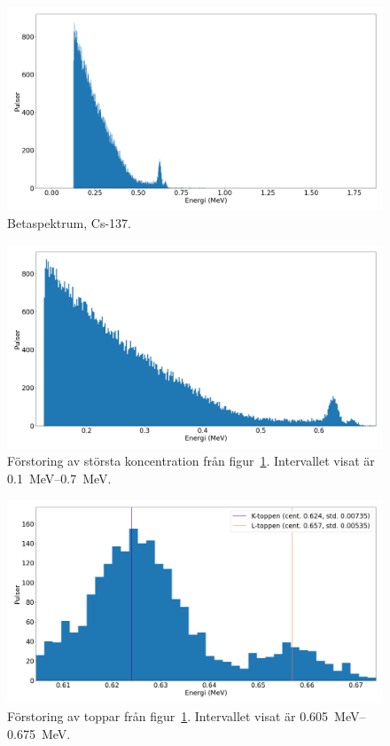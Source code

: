 \begin{figure}[!ht]
    \centering
    \includegraphics[width=\textwidth, keepaspectratio]{../images/cesium.png}
    \caption{Betaspektrum, Cs-137.}
    \label{fig:cesium}
\end{figure}

\begin{figure}[!ht]
    \centering
    \includegraphics[width=\textwidth, keepaspectratio]{../images/cesium_zoom.png}
    \caption{
        Förstoring av största koncentration från figur~\ref{fig:cesium}.
        Intervallet visat är \qtyrange{0.1}{0.7}{\MeV}.
    }
    \label{fig:cesiumzoom}
\end{figure}

\begin{figure}[!ht]
    \centering
    \includegraphics[width=\textwidth, keepaspectratio]{../images/cesium_top.png}
    \caption{
        Förstoring av toppar från figur~\ref{fig:cesium}.
        Intervallet visat är \qtyrange{0.605}{0.675}{\MeV}.
    }
    \label{fig:cesiumtop}
\end{figure}

